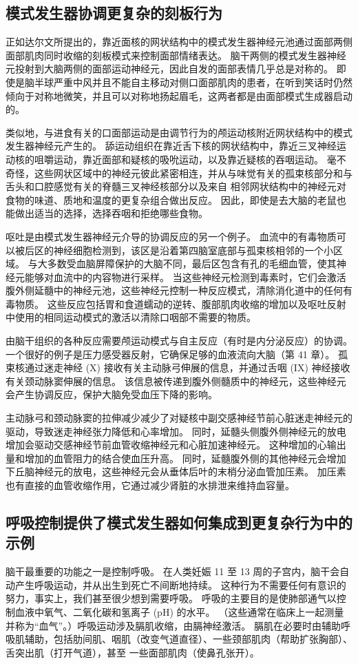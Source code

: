 \subsection{模式发生器协调更复杂的刻板行为}
正如达尔文所提出的，靠近面核的网状结构中的模式发生器神经元池通过面部两侧面部肌肉同时收缩的刻板模式来控制面部情绪表达。 脑干两侧的模式发生器神经元投射到大脑两侧的面部运动神经元，因此自发的面部表情几乎总是对称的。 即使是脑半球严重中风并且不能自主移动对侧口面部肌肉的患者，在听到笑话时仍然倾向于对称地微笑，并且可以对称地扬起眉毛，这两者都是由面部模式生成器启动的。

类似地，与进食有关的口面部运动是由调节行为的颅运动核附近网状结构中的模式发生器神经元产生的。 舔运动组织在靠近舌下核的网状结构中，靠近三叉神经运动核的咀嚼运动，靠近面部和疑核的吸吮运动，以及靠近疑核的吞咽运动。 毫不奇怪，这些网状区域中的神经元彼此紧密相连，并从与味觉有关的孤束核部分和与舌头和口腔感觉有关的脊髓三叉神经核部分以及来自 相邻网状结构中的神经元对食物的味道、质地和温度的更复杂组合做出反应。 因此，即使是去大脑的老鼠也能做出适当的选择，选择吞咽和拒绝哪些食物。

呕吐是由模式发生器神经元介导的协调反应的另一个例子。 血流中的有毒物质可以被后区的神经细胞检测到，该区是沿着第四脑室底部与孤束核相邻的一个小区域。 与大多数受血脑屏障保护的大脑不同，最后区包含有孔的毛细血管，使其神经元能够对血流中的内容物进行采样。 当这些神经元检测到毒素时，它们会激活腹外侧延髓中的神经元池，这些神经元控制一种反应模式，清除消化道中的任何有毒物质。 这些反应包括胃和食道蠕动的逆转、腹部肌肉收缩的增加以及呕吐反射中使用的相同运动模式的激活以清除口咽部不需要的物质。

由脑干组织的各种反应需要颅运动模式与自主反应（有时是内分泌反应）的协调。 一个很好的例子是压力感受器反射，它确保足够的血液流向大脑（第 41 章）。 孤束核通过迷走神经 (X) 接收有关主动脉弓伸展的信息，并通过舌咽 (IX) 神经接收有关颈动脉窦伸展的信息。 该信息被传递到腹外侧髓质中的神经元，这些神经元会产生协调反应，保护大脑免受血压下降的影响。

主动脉弓和颈动脉窦的拉伸减少减少了对疑核中副交感神经节前心脏迷走神经元的驱动，导致迷走神经张力降低和心率增加。 同时，延髓头侧腹外侧神经元的放电增加会驱动交感神经节前血管收缩神经元和心脏加速神经元。 这种增加的心输出量和增加的血管阻力的结合使血压升高。 同时，延髓腹外侧的其他神经元会增加下丘脑神经元的放电，这些神经元会从垂体后叶的末梢分泌血管加压素。 加压素也有直接的血管收缩作用，它通过减少肾脏的水排泄来维持血容量。

\subsection{呼吸控制提供了模式发生器如何集成到更复杂行为中的示例}
脑干最重要的功能之一是控制呼吸。 在人类妊娠 11 至 13 周的子宫内，脑干会自动产生呼吸运动，并从出生到死亡不间断地持续。 这种行为不需要任何有意识的努力，事实上，我们甚至很少想到需要呼吸。 呼吸的主要目的是使肺部通气以控制血液中氧气、二氧化碳和氢离子 (pH) 的水平。 （这些通常在临床上一起测量并称为“血气”。）呼吸运动涉及膈肌收缩，由膈神经激活。 膈肌在必要时由辅助呼吸肌辅助，包括肋间肌、咽肌（改变气道直径）、一些颈部肌肉（帮助扩张胸部）、舌突出肌（打开气道），甚至 一些面部肌肉（使鼻孔张开）。

